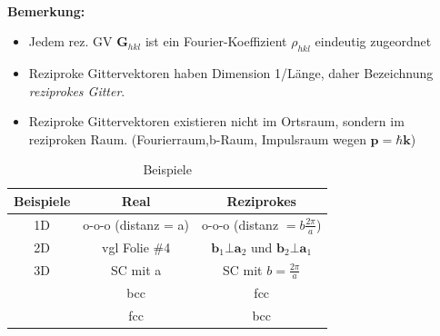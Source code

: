 \begin{itemize}
\begin{itemize}
\begin{align*}
                \end{align*}
          \end{itemize}
          \textbf{Bemerkung:}
          \begin{itemize}
              \item Jedem rez. GV $\textbf{G}_{hkl}$ ist ein Fourier-Koeffizient $\rho_{hkl}$ eindeutig zugeordnet
              \item Reziproke Gittervektoren haben Dimension 1/Länge, daher Bezeichnung \textit{reziprokes Gitter}.
              \item Reziproke Gittervektoren existieren nicht im Ortsraum, sondern im reziproken Raum. (Fourierraum,b-Raum, Impulsraum wegen $\textbf{p}= \hbar \textbf{k}$)
          \end{itemize}
          \begin{table}[htbp]
              \centering
              \caption{Beispiele}
              \begin{tabular}{ccc}
                  \hline
                  Beispiele & Real                & Reziprokes                                                            \\ \hline
                  1D        & o-o-o (distanz = a) & o-o-o  (distanz $= b \frac{2\pi}{a}$)                                 \\
                  2D        & vgl Folie \#4       & $\textbf{b}_1 \bot \textbf{a}_2$ und $\textbf{b}_2 \bot \textbf{a}_1$ \\
                  3D        & SC mit a            & SC mit $b=\frac{2\pi}{a}$                                             \\
                            & bcc                 & fcc                                                                   \\
                            & fcc                 & bcc                                                                   \\ \hline
              \end{tabular}
          \end{table}


\end{itemize}
